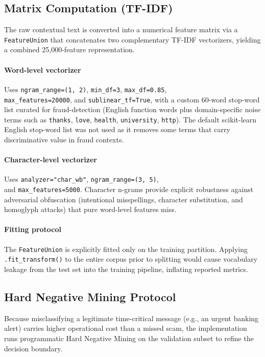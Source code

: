 \subsection{Matrix Computation (TF-IDF)}

The raw contextual text is converted into a numerical feature matrix via a
\texttt{FeatureUnion} that concatenates two complementary TF-IDF
vectorizers, yielding a combined 25{,}000-feature representation.

\paragraph{Word-level vectorizer} Uses
\texttt{ngram\_range=(1, 2)}, \texttt{min\_df=3}, \texttt{max\_df=0.85},\\
\texttt{max\_features=20000}, and \texttt{sublinear\_tf=True}, with a custom
60-word stop-word list curated for fraud-detection (English function words
plus domain-specific noise terms such as \texttt{thanks}, \texttt{love},
\texttt{health}, \texttt{university}, \texttt{http}). The default scikit-learn
English stop-word list was not used as it removes some terms that carry
discriminative value in fraud contexts.

\paragraph{Character-level vectorizer} Uses
\texttt{analyzer="char\_wb"}, \texttt{ngram\_range=(3, 5)},\\ and
\texttt{max\_features=5000}. Character n-grams provide explicit robustness
against adversarial obfuscation (intentional misspellings, character
substitution, and homoglyph attacks) that pure word-level features miss.

\paragraph{Fitting protocol} The \texttt{FeatureUnion} is explicitly fitted
only on the training partition. Applying \texttt{.fit\_transform()} to the
entire corpus prior to splitting would cause vocabulary leakage from the
test set into the training pipeline, inflating reported metrics.

\subsection{Hard Negative Mining Protocol}
\label{sec:hnm-mining}
Because misclassifying a legitimate time-critical message (e.g., an urgent banking alert) carries higher operational cost than a missed scam, the implementation runs programmatic Hard Negative Mining on the validation subset to refine the decision boundary.

